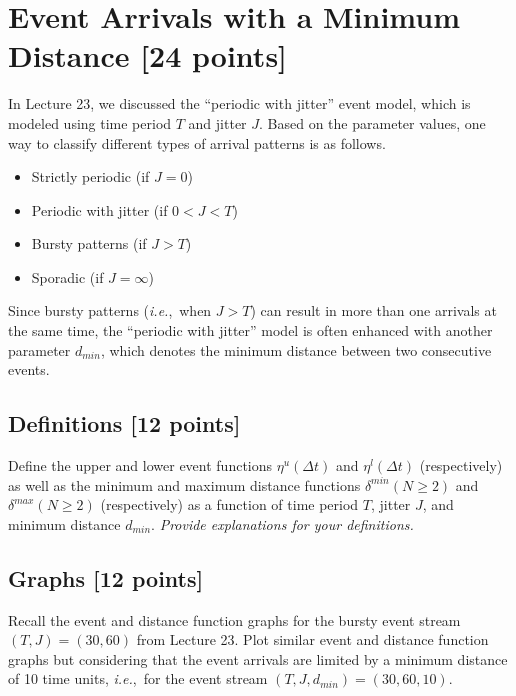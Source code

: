\documentclass[12pt]{article}
\newcommand{\ie}{{\textit{i.e.}}}
\begin{document}
\section{Event Arrivals with a Minimum Distance [24 points]}

In Lecture 23, we discussed the ``periodic with jitter'' event model, which is
modeled using time period $T$ and jitter $J$.
Based on the parameter values, one way to classify different types of arrival
patterns is as follows.
\begin{itemize}
\item Strictly periodic (if $J = 0$)
\item Periodic with jitter (if $0 < J < T$)
\item Bursty patterns (if $J > T$)
\item Sporadic (if $J = \infty$)
\end{itemize}
Since bursty patterns (\ie,~when $J > T$) can result in more than one arrivals
at the same time, the ``periodic with jitter'' model is often enhanced with
another parameter $d_{min}$, which denotes the minimum distance between two
consecutive events.

\subsection{Definitions [12 points]}
Define the upper and lower event functions $\eta^u(\Delta t)$ and
$\eta^l(\Delta t)$ (respectively) as well as the minimum and maximum distance
functions $\delta^{min}(N \geq 2)$ and $\delta^{max}(N \geq 2)$ (respectively)
as a function of time period $T$, jitter $J$, and minimum distance $d_{min}$.
\textit{Provide explanations for your definitions.}

\subsection{Graphs [12 points]}
Recall the event and distance function graphs for the bursty event stream
$(T, J) = (30, 60)$ from Lecture 23.
Plot similar event and distance function graphs but considering that the event
arrivals are limited by a minimum distance of 10 time units, \ie,~for the event
stream $(T, J, d_{min}) = (30, 60, 10)$.
\end{document}
